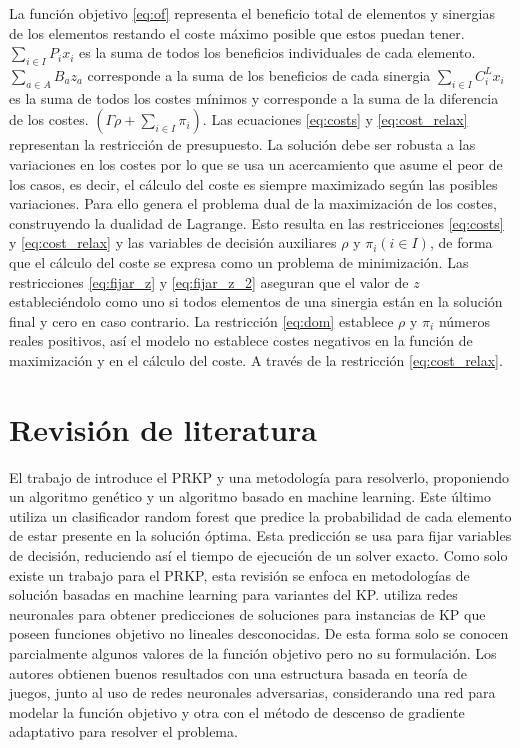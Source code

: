 \documentclass[spanish, a4paper, 12pt, openany,final]{book}
\begin{document}
    
    La función objetivo \eqref{eq:of} representa el beneficio total de elementos y sinergias de los elementos restando el coste máximo posible que estos puedan tener. $\sum_{i\in I} P_i x_i$ es la suma de todos los beneficios individuales de cada elemento. $\sum_{a\in A} B_a z_a$ corresponde a la suma de los beneficios de cada sinergia $\sum_{i\in I} C_i^L x_i$ es la suma de todos los costes mínimos  y corresponde a la suma de la diferencia de los costes. $\left(\Gamma\rho+\sum_{i\in I} \pi_i\right)$. Las ecuaciones \eqref{eq:costs} y \eqref{eq:cost_relax} representan la restricción de presupuesto. La solución debe ser robusta a las variaciones en los costes por lo que se usa un acercamiento que asume el peor de los casos, es decir, el cálculo del coste es siempre maximizado según las posibles variaciones. Para ello \cite{baldo_polynomial_2023} genera el problema dual de la maximización de los costes, construyendo la dualidad de Lagrange. Esto resulta en las restricciones \eqref{eq:costs} y \eqref{eq:cost_relax} y las variables de decisión auxiliares $\rho$ y $\pi_i (i \in I)$, de forma que el cálculo del coste se expresa como un problema de minimización. Las restricciones \eqref{eq:fijar_z} y \eqref{eq:fijar_z_2} aseguran que el valor de $z$ estableciéndolo como uno si todos elementos de una sinergia están en la solución final y cero en caso contrario. La restricción \eqref{eq:dom} establece $\rho$ y $\pi_i$ números reales positivos, así el modelo no establece costes negativos en la función de maximización y en el cálculo del coste. A través de la restricción \eqref{eq:cost_relax}.
  
\section{Revisión de literatura}


El trabajo de \cite{baldo_polynomial_2023} introduce el PRKP y una metodología para resolverlo, proponiendo un algoritmo genético y un algoritmo basado en machine learning. Este último utiliza un clasificador random forest que predice la probabilidad de cada elemento de estar presente en la solución óptima. Esta predicción se usa para fijar variables de decisión, reduciendo así el tiempo de ejecución de un solver exacto. Como solo existe un trabajo para el PRKP, esta revisión se enfoca en metodologías de solución basadas en machine learning para variantes del KP. \cite{li_novel_2021} utiliza redes neuronales para obtener predicciones de soluciones para instancias de KP que poseen funciones objetivo no lineales desconocidas. De esta forma solo se conocen parcialmente algunos valores de la función objetivo pero no su formulación. Los autores obtienen buenos resultados con una estructura basada en teoría de juegos, junto al uso de redes neuronales adversarias, considerando una red para modelar la función objetivo y otra con el método de descenso de gradiente adaptativo para resolver el problema.
\end{document}
